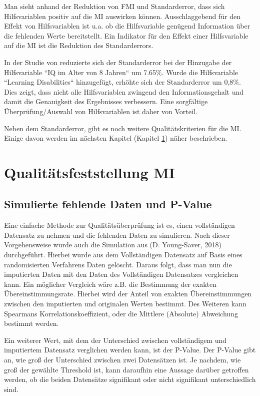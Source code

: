 Man sieht anhand der Reduktion von FMI und Standarderror, dass sich Hilfsvariablen positiv auf die MI auswirken können. Ausschlaggebend für den Effekt von Hilfsvariablen
ist u.a. ob die Hilfsvariable genügend Information über die fehlenden Werte bereitstellt. \autocite[1302]{Hughes2019} Ein Indikator für den Effekt einer Hilfsvariable auf 
die MI ist die Reduktion des Standarderrors. 

In der Studie von \textcite[]{Madley-Dowd2019} 
reduzierte sich der Standarderror bei der Hinzugabe der Hilfsvariable 
``IQ im Alter von 8 Jahren`` um 7.65\%. Wurde die Hilfsvariable ``Learning Disabilities``  hinzugefügt, erhöhte sich der Standarderror um 0,8\%. \autocite[71]{Madley-Dowd2019} 
Dies zeigt, dass nicht alle Hilfsvariablen zwingend den Informationsgehalt und damit die Genauigkeit des Ergebnisses verbessern. 
Eine sorgfältige Überprüfung/Auswahl von Hilfsvariablen ist daher von Vorteil. 

Neben dem Standarderror, gibt es noch weitere Qualitätskriterien für die MI. Einige davon werden im nächsten Kapitel
(Kapitel \ref{section:qualtity}) näher beschrieben.


\section{Qualitätsfeststellung MI}
\label{section:qualtity}

\subsection{Simulierte fehlende Daten und P-Value}

Eine einfache Methode zur Qualitätsüberprüfung ist es, einen vollständigen Datensatz zu nehmen und die fehlenden Daten zu 
simulieren. Nach dieser Vorgehensweise wurde auch die Simulation aus (D. Young-Saver, 2018) durchgeführt. Hierbei wurde 
aus dem Vollständigen Datensatz auf Basis eines randomisierten Verfahrens Daten gelöscht. Daraus folgt, dass man nun die 
imputierten Daten mit den Daten des Vollständigen Datensatzes vergleichen kann. Ein möglicher Vergleich wäre z.B. die 
Bestimmung der exakten Übereinstimmungsrate. Hierbei wird der Anteil von exakten Übereinstimmungen zwischen den imputierten 
und originalen Werten bestimmt. Des Weiteren kann Spearmans Korrelationskoeffizient, oder die Mittlere (Absolute) Abweichung 
bestimmt werden. \autocite[3664]{Young-Saver2018} 

Ein weiterer Wert, mit dem der Unterschied zwischen vollständigem und imputiertem Datensatz verglichen werden kann, ist der P-Value.
Der P-Value gibt an, wie groß der Unterschied zwischen zwei Datensätzen ist. Je nachdem, wie groß der gewählte Threshold ist,
kann daraufhin eine Aussage darüber getroffen werden, ob die beiden Datensätze signifikant oder nicht signifikant unterschiedlich
sind. 

